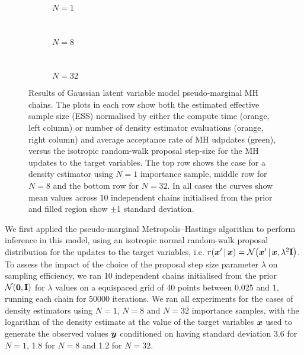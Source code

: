 \begin{figure}
\centering
\begin{subfigure}[b]{\linewidth}
\centering
  \caption{$N=1$}
  \label{sfig:pm-mh-1-gaussian-latent}
\end{subfigure}
\\[3mm]
\begin{subfigure}[b]{\linewidth}
\centering
  \caption{$N=8$}
  \label{sfig:pm-mh-8-gaussian-latent}
\end{subfigure}
\\[3mm]
\begin{subfigure}[b]{\linewidth}
\centering
  \caption{$N=32$}
  \label{sfig:pm-mh-32-gaussian-latent}
\end{subfigure}
\caption[Pseudo-marginal \acs{MH} Gaussian model results.]{
Results of Gaussian latent variable model pseudo-marginal \acs{MH} chains. The plots in each row show both the estimated effective sample size (ESS) normalised by either the compute time (orange, left column) or number of density estimator evaluations (orange, right column) and average acceptance rate of \ac{MH} udpdates (green), versus the isotropic random-walk proposal step-size for the \ac{MH} updates to the target variables. The top row shows the case for a density estimator using $N=1$ importance sample, middle row for $N=8$ and the bottom row for $N=32$. In all cases the curves show mean values across 10 independent chains initialised from the prior and filled region show $\pm 1$ standard deviation.}
\label{fig:pmmh-gaussian-latent-results}
\end{figure}

We first applied the pseudo-marginal Metropolis--Hastings algorithm to perform inference in this model, using an isotropic normal random-walk proposal distribution for the updates to the target variables, i.e. $r(\vct{x}'\gvn\vct{x}) = \nrm{\vct{x}'\gvn\vct{x},\lambda^2\mathbf{I}}$. To assess the impact of the choice of the proposal step size parameter $\lambda$ on sampling efficiency, we ran 10 independent chains initialised from the prior $\nrm{\vct{0},\mathbf{I}}$ for $\lambda$ values on a equispaced grid of 40 points between 0.025 and 1, running each chain for 50000 iterations. We ran all experiments for the cases of density estimators using $N=1$, $N=8$ and $N=32$ importance samples, with the logarithm of the density estimate at the value of the target variables $\boldsymbol{x}$ used to generate the observed values $\boldsymbol{y}$ conditioned on having standard deviation 3.6 for $N=1$, 1.8 for $N=8$ and 1.2 for $N=32$.


